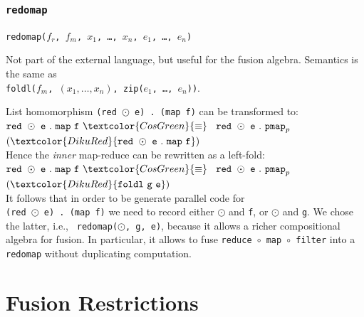 \documentclass{beamer}
\newcommand{\emp}[1]{\textcolor{DikuRed}{ #1}}
\newcommand{\emphh}[1]{\textcolor{CosGreen}{ #1}}
\begin{document}
\begin{frame}[fragile,t]
  \frametitle{{\tt redomap}}

  {\tt redomap($f_{r}$, $f_{m}$, $x_{1}$, \ldots, $x_{n}$, $e_{1}$, \ldots, $e_{n}$)}

  Not part of the external language, but useful for the fusion
  algebra.  Semantics is the same as\\{\tt foldl($f_{m}$, $(x_{1},\ldots,x_{n})$, zip($e_{1}$, \ldots, $e_{n}$))}.
\pause
\begin{block}{List homomorphism} {\tt (red $\odot$ e) . (map f)} can
  be transformed to:  \\
  ${\tt red}\mbox{ }\odot\mbox{ }{\tt e}\mbox{ }.\mbox{ }{\tt
    map}\mbox{ }{\tt f}\mbox{ }\emphh{\equiv}$ $\mbox{ }{\tt
    red}\mbox{ }\odot\mbox{ }{\tt e}\mbox{ }.\mbox{ }{\tt pmap}_{p}
  \mbox{ }$ $(\emp{{\tt red} \mbox{
    }\odot\mbox{ }{\tt e}\mbox{ }.\mbox{ }{\tt map}\mbox{ }{\tt f}})$\\
  Hence the {\em inner} map-reduce can be
  rewritten as a left-fold:\\
  ${\tt red}\mbox{ }\odot\mbox{ }{\tt e}\mbox{ }.\mbox{ }{\tt
    map}\mbox{ }{\tt f}\mbox{ }\emphh{\equiv}$ $\mbox{ }{\tt
    red}\mbox{ }\odot\mbox{ }{\tt e}\mbox{ }.\mbox{ }{\tt pmap}_{p}
  \mbox{ }$ $(\emp{{\tt foldl}\mbox{
    }{\tt g}\mbox{ }{\tt e}})$\\
  It follows that in order to be generate parallel code for \\
  {\tt (red $\odot$ e) . (map f)} we need to record either $\odot$ and
  {\tt f}, or $\odot$ and {\tt g}. We chose the latter, i.e., {\tt
    redomap($\odot$, g, e)}, because it allows a richer compositional
  algebra for fusion.  In particular, it allows to fuse {\tt reduce
    $\circ$ map $\circ$ filter} into a {\tt redomap} without
  duplicating computation.
\end{block}

\end{frame}

\section{Fusion Restrictions}
\end{document}
